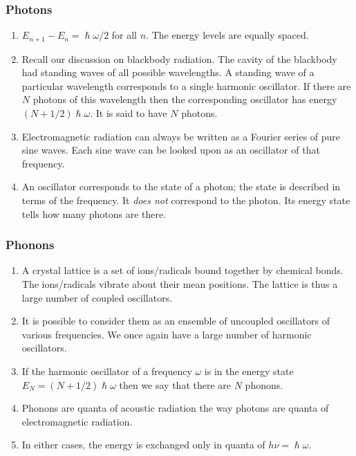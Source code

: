 \documentclass{beamer}
\begin{document}
\begin{frame}
\frametitle{Photons}
\begin{enumerate}
\item $E_{n+1} - E_n = \hslash\omega/2$ for all $n$. The energy levels are 
equally spaced.
\item Recall our discussion on blackbody radiation. The cavity of the blackbody
had standing waves of all possible wavelengths. A standing wave of a particular
wavelength corresponds to a single harmonic oscillator. If there are $N$ photons
of this wavelength then the corresponding oscillator has energy $(N + 1/2)
\hslash\omega$. It is said to have $N$ photons.
\item Electromagnetic radiation can always be written as a Fourier series of
pure sine waves. Each sine wave can be looked upon as an oscillator of that
frequency. 
\item An oscillator corresponds to the state of a photon; the state is described
in terms of the frequency. It \emph{does not} correspond to the photon. Its
energy state tells how many photons are there.
\end{enumerate}
\end{frame}

\begin{frame}
\frametitle{Phonons}
\begin{enumerate}
\item A crystal lattice is a set of ions/radicals bound together by chemical
bonds. The ions/radicals vibrate about their mean positions. The lattice is
thus a large number of coupled oscillators.
\item It is possible to consider them as an ensemble of uncoupled oscillators
of various frequencies. We once again have a large number of harmonic 
oscillators. 
\item If the harmonic oscillator of a frequency $\omega$ is in the energy state
$E_N = (N + 1/2)\hslash\omega$ then we say that there are $N$ phonons.
\item Phonons are quanta of acoustic radiation the way photons are quanta of 
electromagnetic radiation.
\item In either cases, the energy is exchanged only in quanta of $h\nu = 
\hslash\omega$.
\end{enumerate}
\end{frame}
\end{document}
